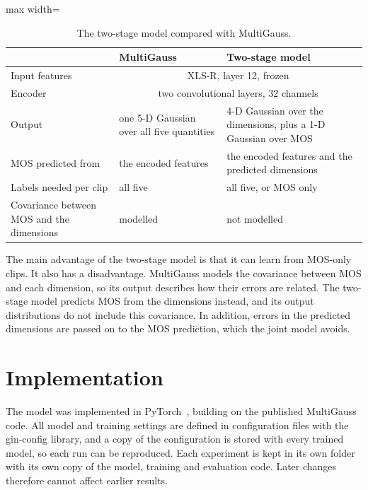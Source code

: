 \documentclass[
english,                 %
bibtex,                  %
includeExtraAbstracts, %
]{kththesis}
\numberwithin{listing}{chapter}
\begin{document}
\begin{table}[!ht]
  \centering
  \caption{The two-stage model compared with MultiGauss.}
  \label{tab:twoStageVsMultiGauss}
  \setlength{\tabcolsep}{4pt}
  \begin{adjustbox}{max width=\textwidth}
  \begin{tabular}{p{3.6cm}p{4.4cm}p{4.4cm}}
    \toprule
     & MultiGauss & Two-stage model \\
    \midrule
    Input features & \multicolumn{2}{c}{XLS-R, layer 12, frozen} \\
    Encoder & \multicolumn{2}{c}{two convolutional layers, 32 channels} \\
    Output & one 5-D Gaussian over all five quantities & 4-D Gaussian over the dimensions, plus a 1-D Gaussian over MOS \\
    MOS predicted from & the encoded features & the encoded features and the predicted dimensions \\
    Labels needed per clip & all five & all five, or MOS only \\
    Covariance between MOS and the dimensions & modelled & not modelled \\
    \bottomrule
  \end{tabular}
  \end{adjustbox}
\end{table}

The main advantage of the two-stage model is that it can learn from MOS-only clips. It also has a disadvantage. MultiGauss models the covariance between MOS and each dimension, so its output describes how their errors are related. The two-stage model predicts MOS from the dimensions instead, and its output distributions do not include this covariance. In addition, errors in the predicted dimensions are passed on to the MOS prediction, which the joint model avoids.

\section{Implementation}
\label{sec:implementation}

The model was implemented in PyTorch~\cite{paszke_pytorch_2019}, building on the published MultiGauss code. All model and training settings are defined in configuration files with the gin-config library, and a copy of the configuration is stored with every trained model, so each run can be reproduced. Each experiment is kept in its own folder with its own copy of the model, training and evaluation code. Later changes therefore cannot affect earlier results.
\end{document}
